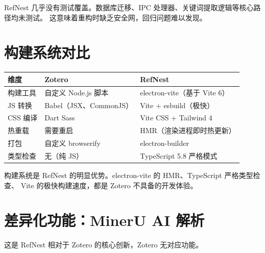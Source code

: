 \documentclass[12pt, a4paper]{article}
\begin{document}
\begin{tcolorbox}[badbox]
  RefNest 几乎没有测试覆盖。数据库迁移、IPC 处理器、关键词提取逻辑等核心路径均未测试。
  这意味着重构时缺乏安全网，回归问题难以发现。
\end{tcolorbox}

\section{构建系统对比}

\begin{center}
\begin{tabular}{p{3.5cm} p{5cm} p{5cm}}
  \toprule
  \textbf{维度} & \textbf{Zotero} & \textbf{RefNest} \\
  \midrule
  构建工具      & 自定义 Node.js 脚本 & electron-vite（基于 Vite 6） \\
  JS 转换       & Babel（JSX、CommonJS） & Vite + esbuild（极快） \\
  CSS 编译      & Dart Sass & Vite CSS + Tailwind 4 \\
  热重载        & 需要重启 & HMR（渲染进程即时热更新） \\
  打包          & 自定义 browserify & electron-builder \\
  类型检查      & 无（纯 JS） & TypeScript 5.8 严格模式 \\
  \bottomrule
\end{tabular}
\end{center}

\begin{tcolorbox}[goodbox]
  构建系统是 RefNest 的明显优势。electron-vite 的 HMR、TypeScript 严格类型检查、
  Vite 的极快构建速度，都是 Zotero 不具备的开发体验。
\end{tcolorbox}

\section{差异化功能：MinerU AI 解析}

这是 RefNest 相对于 Zotero 的核心创新，Zotero 无对应功能。
\end{document}
